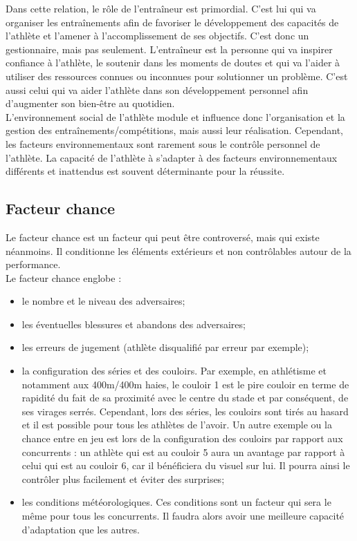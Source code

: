             Dans cette relation, le rôle de l'entraîneur est primordial. C'est lui qui va organiser les entraînements afin de favoriser le développement des capacités de l'athlète et l'amener à l'accomplissement de ses objectifs. C'est donc un gestionnaire, mais pas seulement. L'entraîneur est la personne qui va inspirer confiance à l'athlète, le soutenir dans les moments de doutes et qui va l'aider à utiliser des ressources connues ou inconnues pour solutionner un problème. C'est aussi celui qui va aider l'athlète dans son développement personnel afin d'augmenter son bien-être au quotidien.\\
         
         
            L'environnement social de l'athlète module et influence donc l'organisation et la gestion des entraînements/compétitions, mais aussi leur réalisation.
            Cependant, les facteurs environnementaux sont rarement sous le contrôle personnel de l'athlète. La capacité de l'athlète à s'adapter à des facteurs environnementaux différents et inattendus est souvent déterminante pour la réussite. \\
            
            
        \subsection{Facteur chance}    
            
            Le facteur chance est un facteur qui peut être controversé, mais qui existe néanmoins. Il conditionne les éléments extérieurs et non contrôlables autour de la performance.\\
            
            Le facteur chance englobe :
            \begin{itemize}
                \item le nombre et le niveau des adversaires;
                \item les éventuelles blessures et abandons des adversaires;
                \item les erreurs de jugement (athlète disqualifié par erreur par exemple);
                \item la configuration des séries et des couloirs. Par exemple, en athlétisme et notamment aux 400m/400m haies, le couloir 1 est le pire couloir en terme de rapidité du fait de sa proximité avec le centre du stade et par conséquent, de ses virages serrés. Cependant, lors des séries, les couloirs sont tirés au  hasard et il est possible pour tous les athlètes de l'avoir. Un autre exemple ou la chance entre en jeu est lors de la configuration des couloirs par rapport aux concurrents : un athlète qui est au couloir 5 aura un avantage par rapport à celui qui est au couloir 6, car il bénéficiera du visuel sur lui. Il pourra ainsi le contrôler plus facilement et éviter des surprises;
                \item les conditions météorologiques. Ces conditions sont un facteur qui sera le même pour tous les concurrents. Il faudra alors avoir une meilleure capacité d'adaptation que les autres.\\
            \end{itemize}
            
